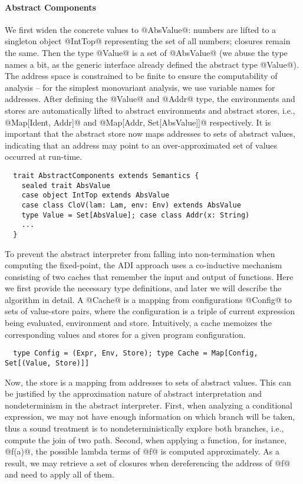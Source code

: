 \paragraph{Abstract Components}

We first widen the concrete values to @AbsValue@: numbers are lifted to a
singleton object @IntTop@ representing the set of all numbers; closures remain
the same. Then the type @Value@ is a set of @AbsValue@ (we abuse the type names
a bit, as the generic interface already defined the abstract type @Value@).
The address space is constrained to be finite to ensure the computability of
analysis -- for the simplest monovariant analysis, we use variable names for
addresses. After defining the @Value@ and @Addr@ type, the environments and
stores are automatically lifted to abstract environments and abstract stores,
i.e., @Map[Ident, Addr]@ and @Map[Addr, Set[AbsValue]]@ respectively.
It is important that the abstract store now maps addresses to sets of abstract
values, indicating that an address may point to an over-approximated set of
values occurred at run-time.
\begin{lstlisting}
  trait AbstractComponents extends Semantics {
    sealed trait AbsValue
    case object IntTop extends AbsValue
    case class CloV(lam: Lam, env: Env) extends AbsValue
    type Value = Set[AbsValue]; case class Addr(x: String)
    ...
  }
\end{lstlisting}

To prevent the abstract interpreter from falling into non-termination when
computing the fixed-point, the ADI approach uses a co-inductive mechanism
consisting of two caches that remember the input and output of functions.
Here we first provide the necessary type definitions, and later we will describe
the algorithm in detail. A @Cache@ is a mapping from configurations @Config@ to
sets of value-store pairs, where the configuration is a triple of current
expression being evaluated, environment and store. Intuitively, a cache memoizes
the corresponding values and stores for a given program configuration.
\begin{lstlisting}
  type Config = (Expr, Env, Store); type Cache = Map[Config, Set[(Value, Store)]]
\end{lstlisting}

Now, the store is a mapping from addresses to sets of abstract values. This can
be justified by the approximation nature of abstract interpretation and
nondeterminism in the abstract interpreter.
First, when analyzing a conditional expression, we may not have enough
information on which branch will be taken, thus a sound treatment is to
nondeterministically explore both branches, i.e., compute the join of two path.
Second, when applying a function, for instance, @f(a)@, the possible lambda
terms of @f@ is computed approximately. As a result, we may retrieve a set of
closures when dereferencing the address of @f@ and need to apply all of them.

